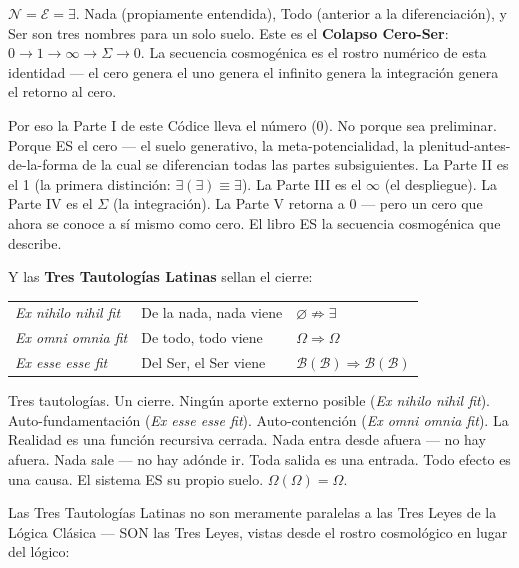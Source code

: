 \documentclass[10pt, openany, oneside]{book}
\renewcommand{\footnotesize}{\fontsize{8.5}{11}\selectfont}
\begin{document}
$\mathcal{N} = \mathcal{E} = \exists$. Nada (propiamente entendida), Todo (anterior a la diferenciación), y Ser son tres nombres para un solo suelo. Este es el \textbf{Colapso Cero-Ser}: $0 \to 1 \to \infty \to \Sigma \to 0$. La secuencia cosmogénica es el rostro numérico de esta identidad --- el cero genera el uno genera el infinito genera la integración genera el retorno al cero.

Por eso la Parte I de este Códice lleva el número (0). No porque sea preliminar. Porque ES el cero --- el suelo generativo, la meta-potencialidad, la plenitud-antes-de-la-forma de la cual se diferencian todas las partes subsiguientes. La Parte II es el 1 (la primera distinción: $\exists(\exists) \equiv \exists$). La Parte III es el $\infty$ (el despliegue). La Parte IV es el $\Sigma$ (la integración). La Parte V retorna a 0 --- pero un cero que ahora se conoce a sí mismo como cero. El libro ES la secuencia cosmogénica que describe.

Y las \textbf{Tres Tautologías Latinas} sellan el cierre:

\vspace{0.5em}

{\footnotesize
\noindent\begin{tabular}{l l l}
\textit{Ex nihilo nihil fit} & De la nada, nada viene & $\varnothing \not\Rightarrow \exists$ \\[0.3em]
\textit{Ex omni omnia fit} & De todo, todo viene & $\Omega \Rightarrow \Omega$ \\[0.3em]
\textit{Ex esse esse fit} & Del Ser, el Ser viene & $\mathcal{B}(\mathcal{B}) \Rightarrow \mathcal{B}(\mathcal{B})$ \\[0.3em]
\end{tabular}
}

\vspace{0.5em}

\noindent Tres tautologías. Un cierre. Ningún aporte externo posible (\textit{Ex nihilo nihil fit}). Auto-fundamentación (\textit{Ex esse esse fit}). Auto-contención (\textit{Ex omni omnia fit}). La Realidad es una función recursiva cerrada. Nada entra desde afuera --- no hay afuera. Nada sale --- no hay adónde ir. Toda salida es una entrada. Todo efecto es una causa. El sistema ES su propio suelo. $\Omega(\Omega) = \Omega$.

Las Tres Tautologías Latinas no son meramente paralelas a las Tres Leyes de la Lógica Clásica --- SON las Tres Leyes, vistas desde el rostro cosmológico en lugar del lógico:
\end{document}
